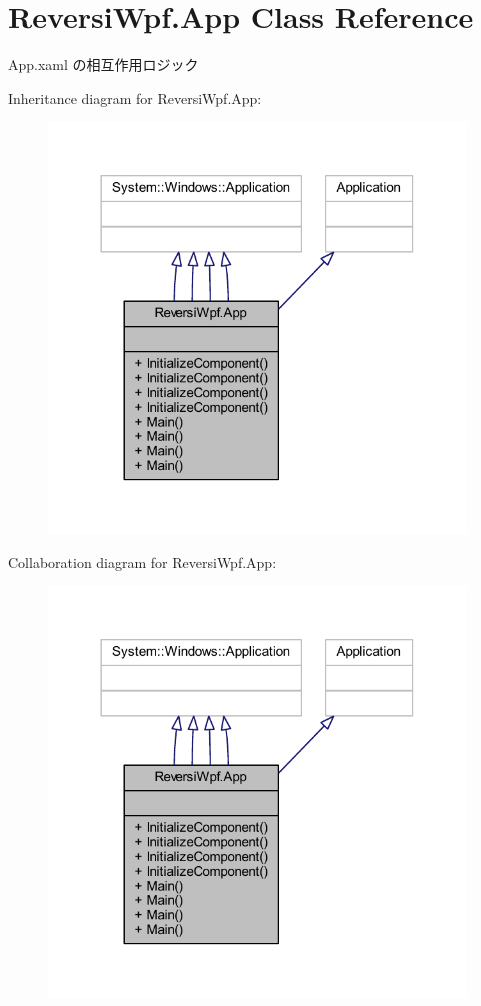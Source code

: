 \hypertarget{class_reversi_wpf_1_1_app}{}\section{Reversi\+Wpf.\+App Class Reference}
\label{class_reversi_wpf_1_1_app}


App.\+xaml の相互作用ロジック  




Inheritance diagram for Reversi\+Wpf.\+App\+:\nopagebreak
\begin{figure}[H]
\begin{center}
\leavevmode
\includegraphics[width=314pt]{class_reversi_wpf_1_1_app__inherit__graph}
\end{center}
\end{figure}


Collaboration diagram for Reversi\+Wpf.\+App\+:\nopagebreak
\begin{figure}[H]
\begin{center}
\leavevmode
\includegraphics[width=314pt]{class_reversi_wpf_1_1_app__coll__graph}
\end{center}
\end{figure}
